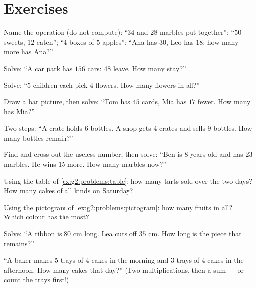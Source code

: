 \section{Exercises}

\begin{exercise}[$\star$]\label{exo:g2:problems:1}
Name the operation (do not compute): ``$34$ and $28$ marbles put
together''; ``$50$ sweets, $12$ eaten''; ``$4$ boxes of $5$
apples''; ``Ana has $30$, Leo has $18$: how many more has Ana?''.
\end{exercise}

\begin{exercise}[$\star$]\label{exo:g2:problems:2}
Solve: ``A car park has $156$ cars; $48$ leave. How many stay?''
\end{exercise}

\begin{exercise}[$\star$]\label{exo:g2:problems:3}
Solve: ``$5$ children each pick $4$ flowers. How many flowers in
all?''
\end{exercise}

\begin{exercise}[$\star$]\label{exo:g2:problems:4}
Draw a bar picture, then solve: ``Tom has $45$ cards, Mia has $17$
fewer. How many has Mia?''
\end{exercise}

\begin{exercise}[$\star$]\label{exo:g2:problems:5}
Two steps: ``A crate holds $6$ bottles. A shop gets $4$ crates and
sells $9$ bottles. How many bottles remain?''
\end{exercise}

\begin{exercise}[$\star$]\label{exo:g2:problems:6}
Find and cross out the useless number, then solve: ``Ben is $8$
years old and has $23$ marbles. He wins $15$ more. How many marbles
now?''
\end{exercise}

\begin{exercise}[$\star$]\label{exo:g2:problems:7}
Using the table of \cref{ex:g2:problems:table}: how many tarts sold
over the two days? How many cakes of all kinds on Saturday?
\end{exercise}

\begin{exercise}[$\star$]\label{exo:g2:problems:8}
Using the pictogram of \cref{ex:g2:problems:pictogram}: how many
fruits in all? Which colour has the most?
\end{exercise}

\begin{exercise}[$\star$]\label{exo:g2:problems:9}
Solve: ``A ribbon is $80$ cm long. Lea cuts off $35$ cm. How long is
the piece that remains?''
\end{exercise}

\begin{exercise}[$\star\star$]\label{exo:g2:problems:10}
``A baker makes $5$ trays of $4$ cakes in the morning and $3$ trays
of $4$ cakes in the afternoon. How many cakes that day?'' (Two
multiplications, then a sum --- or count the trays first!)
\end{exercise}
